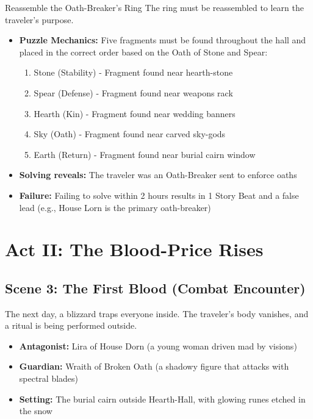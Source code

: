 \documentclass[11pt]{article}
\begin{document}
\begin{puzzlebox}{Reassemble the Oath-Breaker's Ring}
The ring must be reassembled to learn the traveler's purpose.
\begin{itemize}
    \item \textbf{Puzzle Mechanics:} Five fragments must be found throughout the hall and placed in the correct order based on the Oath of Stone and Spear:
    \begin{enumerate}
        \item Stone (Stability) - Fragment found near hearth-stone
        \item Spear (Defense) - Fragment found near weapons rack
        \item Hearth (Kin) - Fragment found near wedding banners
        \item Sky (Oath) - Fragment found near carved sky-gods
        \item Earth (Return) - Fragment found near burial cairn window
    \end{enumerate}
    \item \textbf{Solving reveals:} The traveler was an Oath-Breaker sent to enforce oaths
    \item \textbf{Failure:} Failing to solve within 2 hours results in 1 Story Beat and a false lead (e.g., House Lorn is the primary oath-breaker)
\end{itemize}
\end{puzzlebox}

\section*{Act II: The Blood-Price Rises}

\subsection*{Scene 3: The First Blood (Combat Encounter)}
The next day, a blizzard traps everyone inside. The traveler's body vanishes, and a ritual is being performed outside.

\begin{itemize}
    \item \textbf{Antagonist:} Lira of House Dorn (a young woman driven mad by visions)
    \item \textbf{Guardian:} Wraith of Broken Oath (a shadowy figure that attacks with spectral blades)
    \item \textbf{Setting:} The burial cairn outside Hearth-Hall, with glowing runes etched in the snow
\end{itemize}
\end{document}
